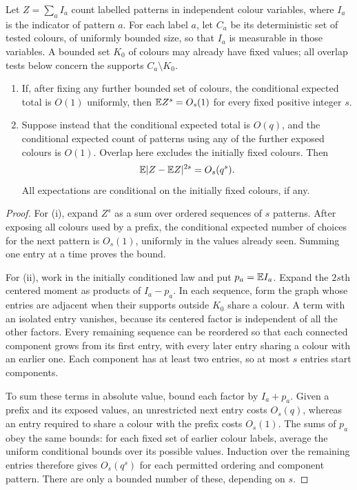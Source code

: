 \begin{lemma}\label{lem:pattern-moments}
Let $Z=\sum_a I_a$ count labelled patterns in independent colour variables,
where $I_a$ is the indicator of pattern $a$. For each label $a$, let $C_a$
be its deterministic set of tested colours, of uniformly bounded size,
so that $I_a$ is measurable in those variables. A bounded set $K_0$ of
colours may already have fixed values; all overlap tests below concern
the supports $C_a\setminus K_0$.
\begin{enumerate}[label=\textup{(\roman*)}]
\item If, after fixing any further bounded set of colours, the conditional
expected total is $O(1)$ uniformly, then $\mathbb E Z^s=O_s(1)$ for every fixed
positive integer $s$.
\item Suppose instead that the conditional expected total is $O(q)$,
and the conditional expected count of patterns using any of the further
exposed colours is $O(1)$. Overlap here excludes the initially fixed
colours. Then
\[
 \mathbb E|Z-\mathbb E Z|^{2s}=O_s(q^s).
\]
All expectations are conditional on the initially fixed colours, if any.
\end{enumerate}
\end{lemma}

\begin{proof}
For (i), expand $Z^s$ as a sum over ordered sequences of $s$ patterns.
After exposing all colours used by a prefix, the conditional expected
number of choices for the next pattern is $O_s(1)$, uniformly in the
values already seen. Summing one entry at a time proves the bound.

For (ii), work in the initially conditioned law and put $p_a=\mathbb E I_a$.
Expand the $2s$th centered moment as products of $I_a-p_a$. In each
sequence, form the graph whose entries are adjacent when their supports
outside $K_0$ share a colour. A term with an isolated entry vanishes,
because its centered factor is independent of all the other factors.
Every remaining sequence can be reordered so that each connected
component grows from its first entry, with every later entry sharing a
colour with an earlier one. Each component has at least two entries, so
at most $s$ entries start components.

To sum these terms in absolute value, bound each factor by $I_a+p_a$.
Given a prefix and its exposed values, an unrestricted next entry costs
$O_s(q)$, whereas an entry required to share a colour with the prefix
costs $O_s(1)$. The sums of $p_a$ obey the same bounds: for each fixed
set of earlier colour labels, average the uniform conditional bounds
over its possible values. Induction over the remaining entries therefore
gives $O_s(q^s)$ for each permitted ordering and component pattern.
There are only a bounded number of these, depending on $s$.
\end{proof}

